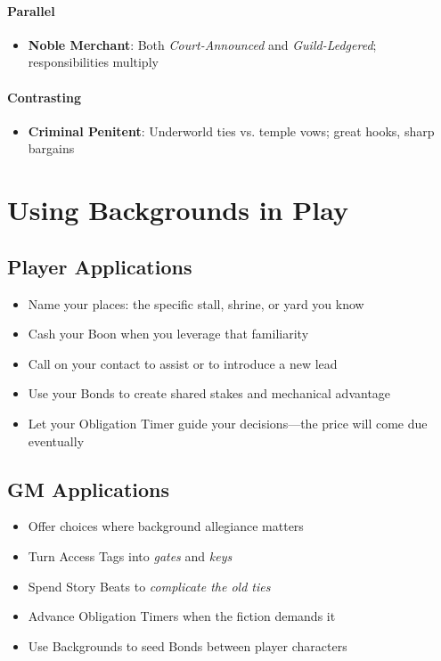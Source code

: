 \paragraph{Parallel}
\begin{itemize}
\item \textbf{Noble Merchant}: Both \textit{Court-Announced} and \textit{Guild-Ledgered}; responsibilities multiply
\end{itemize}

\paragraph{Contrasting}
\begin{itemize}
\item \textbf{Criminal Penitent}: Underworld ties vs. temple vows; great hooks, sharp bargains
\end{itemize}

\section{Using Backgrounds in Play}

\subsection*{Player Applications}
\begin{itemize}
\item Name your places: the specific stall, shrine, or yard you know
\item Cash your Boon when you leverage that familiarity
\item Call on your contact to assist or to introduce a new lead
\item Use your Bonds to create shared stakes and mechanical advantage
\item Let your Obligation Timer guide your decisions---the price will come due eventually
\end{itemize}

\subsection*{GM Applications}
\begin{itemize}
\item Offer choices where background allegiance matters
\item Turn Access Tags into \emph{gates} and \emph{keys}
\item Spend Story Beats to \emph{complicate the old ties}
\item Advance Obligation Timers when the fiction demands it
\item Use Backgrounds to seed Bonds between player characters
\end{itemize}

